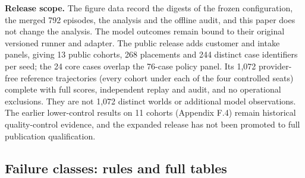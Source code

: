 \textbf{Release scope.} The figure data record the digests of the frozen configuration, the merged 792 episodes, the
analysis and the offline audit, and this paper does not change the analysis. The model outcomes remain bound to their
original versioned runner and adapter. The public release adds customer and intake panels, giving 13 public cohorts,
268 placements and 244 distinct case identifiers per seed; the 24 core cases overlap the 76-case policy panel. Its
1,072 provider-free reference trajectories (every cohort under each of the four controlled seats) complete with full
scores, independent replay and audit, and no operational exclusions. They are not 1,072 distinct worlds or additional
model observations. The earlier lower-control results on 11 cohorts (Appendix F.4) remain historical quality-control
evidence, and the expanded release has not been promoted to full publication qualification.

\subsection{Failure classes: rules and full tables}\label{failure-classes-rules-and-full-tables}

